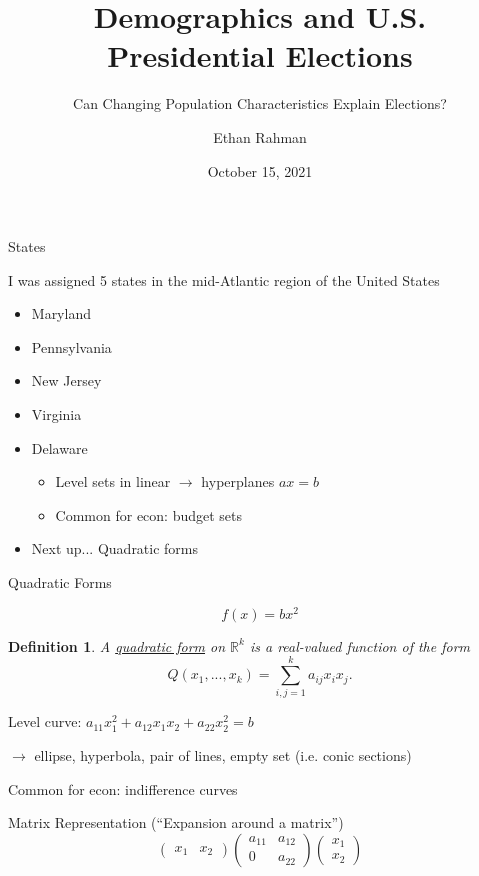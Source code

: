 \documentclass[xcolor=dvipsnames, compress, t]{beamer}
\title[691 Presentation]{Demographics and U.S. Presidential Elections}
\subtitle{Can Changing Population Characteristics Explain Elections?}
\author{Ethan Rahman}
\institute[NIU]{\vspace{-10pt} \large Northern Illinois University}
\date{October 15, 2021}
\newtheorem{defin}{Definition}
\newcommand{\vs}{\vspace{\baselineskip}}
\begin{document}
	\begin{frame}
		\titlepage
	\end{frame}
	
	\begin{frame}{States} 
		
		I was assigned 5 states in the mid-Atlantic region of the United States
		\begin{itemize}
			\item Maryland
			\item Pennsylvania
			\item New Jersey
			\item Virginia
			\item Delaware
			\begin{itemize}
				\item Level sets in linear $\rightarrow$ hyperplanes $a x = b$
				\item {\color{MidnightBlue} Common for econ: budget sets}
			\end{itemize} \pause
			\item Next up... Quadratic forms
		\end{itemize}
		
	\end{frame}
	
	
	\begin{frame}{Quadratic Forms}
		
		{\color{Orchid} $$f(x) = bx^2$$} 
		
		\vspace{-\baselineskip}
		
		\begin{defin}
			A \underline{quadratic form} on $\mathds{R}^k$ is a real-valued function of the form $$Q(x_1, ..., x_k) = \sum_{i, j=1}^k a_{ij} x_i x_j.$$
		\end{defin} \pause
		
		Level curve:  $a_{11} x_1^2 + a_{12} x_1 x_2 + a_{22} x_2^2 = b$
		
		$\rightarrow$ ellipse, hyperbola, pair of lines, empty set (i.e. conic sections) 
		
		{\color{MidnightBlue} Common for econ: indifference curves}\pause
		
		\vs Matrix Representation (``Expansion around a matrix'')
		$$\begin{pmatrix}x_1 & x_2 \end{pmatrix} \begin{pmatrix} a_{11} & a_{12} \\ 0 & a_{22} \end{pmatrix} \begin{pmatrix} x_1 \\ x_2 \end{pmatrix} $$
		
	\end{frame}
\end{document}
